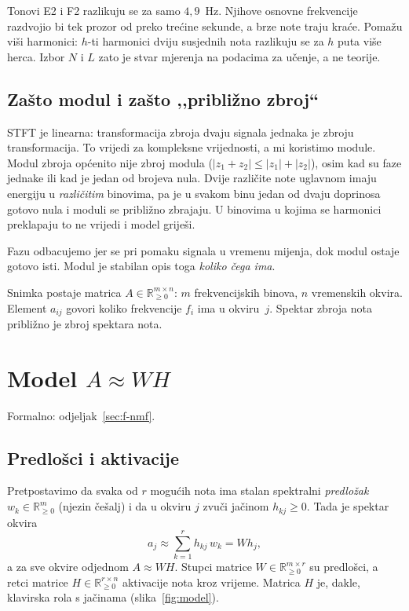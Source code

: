 \documentclass[11pt,a4paper]{article}
\theoremstyle{definition}
\theoremstyle{plain}
\theoremstyle{remark}
\newcommand{\Rp}{\mathbb{R}_{\geq 0}}
\newcommand{\formalno}[1]{{\small\color{muted}\sffamily Formalno: odjeljak~\ref{#1}.}\par}
\begin{document}
Tonovi E2 i F2 razlikuju se za samo $4{,}9$~Hz. Njihove osnovne frekvencije razdvojio bi tek prozor
od preko trećine sekunde, a brze note traju kraće. Pomažu viši harmonici: $h$-ti harmonici dviju
susjednih nota razlikuju se za $h$ puta više herca. Izbor $N$ i $L$ zato je stvar mjerenja na
podacima za učenje, a ne teorije.

\subsection{Zašto modul i zašto ,,približno zbroj``}

STFT je linearna: transformacija zbroja dvaju signala jednaka je zbroju transformacija. To vrijedi
za kompleksne vrijednosti, a mi koristimo module. Modul zbroja općenito nije zbroj modula
($|z_1+z_2|\leq|z_1|+|z_2|$), osim kad su faze jednake ili kad je jedan od brojeva nula. Dvije
različite note uglavnom imaju energiju u \emph{različitim} binovima, pa je u svakom binu jedan
od dvaju doprinosa gotovo nula i moduli se približno zbrajaju. U binovima u kojima se harmonici
preklapaju to ne vrijedi i model griješi.

Fazu odbacujemo jer se pri pomaku signala u vremenu mijenja, dok modul ostaje gotovo isti. Modul je
stabilan opis toga \emph{koliko čega ima}.

\begin{ukratko}
Snimka postaje matrica $A\in\Rp^{m\times n}$: $m$ frekvencijskih binova, $n$ vremenskih okvira.
Element $a_{ij}$ govori koliko frekvencije $f_i$ ima u okviru~$j$. Spektar zbroja nota približno
je zbroj spektara nota.
\end{ukratko}

\section{Model \texorpdfstring{$A\approx WH$}{A ≈ WH}}\label{sec:i-model}
\formalno{sec:f-nmf}

\subsection{Predlošci i aktivacije}

Pretpostavimo da svaka od $r$ mogućih nota ima stalan spektralni \emph{predložak}
$w_k\in\Rp^m$ (njezin češalj) i da u okviru $j$ zvuči jačinom $h_{kj}\geq0$. Tada je spektar okvira
\[
  a_j \approx \sum_{k=1}^r h_{kj}\, w_k = W h_j,
\]
a za sve okvire odjednom $A\approx WH$. Stupci matrice $W\in\Rp^{m\times r}$ su predlošci, a retci
matrice $H\in\Rp^{r\times n}$ aktivacije nota kroz vrijeme. Matrica $H$ je, dakle, klavirska rola s
jačinama (slika~\ref{fig:model}).
\end{document}
